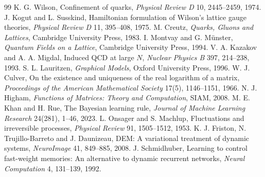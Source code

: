 \documentclass[11pt]{article}
\theoremstyle{definition}
\theoremstyle{remark}
\begin{document}
\begin{thebibliography}{99}
 K. G. Wilson, Confinement of quarks, \emph{Physical Review D} 10, 2445--2459, 1974.
 J. Kogut and L. Susskind, Hamiltonian formulation of Wilson's lattice gauge theories, \emph{Physical Review D} 11, 395--408, 1975.
 M. Creutz, \emph{Quarks, Gluons and Lattices}, Cambridge University Press, 1983.
 I. Montvay and G. M\"unster, \emph{Quantum Fields on a Lattice}, Cambridge University Press, 1994.
 V. A. Kazakov and A. A. Migdal, Induced QCD at large $N$, \emph{Nuclear Physics B} 397, 214--238, 1993.
 S. L. Lauritzen, \emph{Graphical Models}, Oxford University Press, 1996.
 W. J. Culver, On the existence and uniqueness of the real logarithm of a matrix, \emph{Proceedings of the American Mathematical Society} 17(5), 1146--1151, 1966.
 N. J. Higham, \emph{Functions of Matrices: Theory and Computation}, SIAM, 2008.
 M. E. Khan and H. Rue, The Bayesian learning rule, \emph{Journal of Machine Learning Research} 24(281), 1--46, 2023.
 L. Onsager and S. Machlup, Fluctuations and irreversible processes, \emph{Physical Review} 91, 1505--1512, 1953.
 K. J. Friston, N. Trujillo-Barreto and J. Daunizeau, DEM: A variational treatment of dynamic systems, \emph{NeuroImage} 41, 849--885, 2008.
 J. Schmidhuber, Learning to control fast-weight memories: An alternative to dynamic recurrent networks, \emph{Neural Computation} 4, 131--139, 1992.
\end{thebibliography}
\end{document}
